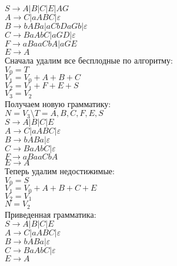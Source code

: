 \documentclass[a4paper,12pt]{article}
\begin{document}
\section{}
$S\rightarrow A\vert B\vert C\vert E\vert AG$\\
$A\rightarrow C\vert aABC\vert \varepsilon$\\
$B\rightarrow bABa\vert aCbDaGb\vert \varepsilon$\\
$C\rightarrow BaAbC\vert aGD\vert \varepsilon$\\
$F\rightarrow aBaaCbA\vert aGE$\\
$E\rightarrow A$\\
Сначала удалим все бесплодные по алгоритму:\\
$V_{0} = T$\\
$V_{1} = V_{0}+A+B+C$\\
$V_{2} = V_{1}+F+E+S$\\
$V_{3} = V_{2}$\\
Получаем новую грамматику:\\
$N=V_{3}\setminus T={A, B, C, F, E, S}$\\
$S\rightarrow A\vert B\vert C\vert E$\\
$A\rightarrow C\vert aABC\vert \varepsilon$\\
$B\rightarrow bABa\vert \varepsilon$\\
$C\rightarrow BaAbC\vert \varepsilon$\\
$F\rightarrow aBaaCbA$\\
$E\rightarrow A$\\
Теперь удалим недостижимые:\\
$V_{0} = S$\\
$V_{1} = V_{0}+A+B+C+E$\\
$V_{2} = V_{1}$\\
$N = V_{2}$\\
Приведенная грамматика:\\
$S\rightarrow A\vert B\vert C\vert E$\\
$A\rightarrow C\vert aABC\vert \varepsilon$\\
$B\rightarrow bABa\vert \varepsilon$\\
$C\rightarrow BaAbC\vert \varepsilon$\\
$E\rightarrow A$\\

\section{}
\end{document}
